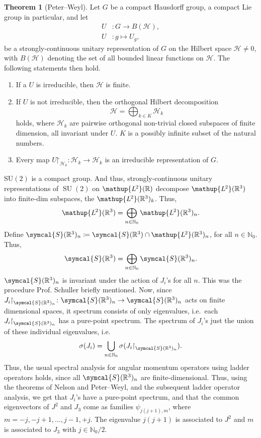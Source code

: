 \documentclass[12pt, a4 paper]{article}
\theoremstyle{definition}
\newtheorem{thm}{Theorem}
\newcommand{\ltwo}{\mathup{L\kern-0.7pt^2}}
\newcommand{\ltworthree}{\ltwo(\rr^3)}
\newcommand{\rr}{\mathbb{R}}
\newcommand{\nn}{\mathbb{N}_0}
\newcommand{\hilbert}{\mathcal{H}}
\newcommand{\ltwor}{\ltwo(\rr)}
\newcommand{\schwartz}{\symcal{S}}
\newcommand{\schwartzrthree}{\schwartz(\rr^3)}
\newcommand{\restr}{\mathord{\restriction}}
\begin{document}
	\begin{thm}[Peter--Weyl]
	    Let \(G\) be a compact Hausdorff group, a compact Lie group in particular, and let
		\begin{align*}
			U &\colon G \rightarrow B(\hilbert),\\
			U &\colon g \mapsto U_g,
		\end{align*}
		be a strongly-continuous unitary representation of $G$ on the Hilbert space $\hilbert \neq 0$, with $B(\hilbert)$ denoting the set of all bounded linear functions on $\hilbert$. The following statements then hold.
		\begin{enumerate}
		    \item If a \(U\) is irreducible, then \(\hilbert\) is finite.
			\item If \(U\) is not irreducible, then the orthogonal Hilbert decomposition
			\[
				\hilbert = \bigoplus_{k\in K} \hilbert_k
			\]
			holds, where \(\hilbert_k\) are pairwise orthogonal non-trivial closed subspaces of finite dimension, all invariant under \(U\). \(K\) is a possibly infinite subset of the natural numbers.
			\item Every map \(U\restr_{\hilbert_k} \colon \hilbert_k \rightarrow \hilbert_k\) is an irreducible representation of \(G\).
		\end{enumerate}
	\end{thm}

	\(\operatorname{SU(2)}\) is a compact group. And thus, strongly-continuous unitary representations of \(\operatorname{SU}(2)\) on \(\ltwor\) decompose \(\ltworthree\) into finite-dim subspaces, the \(\ltworthree_k\). Thus,
	\[
		\ltworthree = \bigoplus_{n \in \nn} \ltworthree_n.
	\]
	Define \(\schwartzrthree_n \coloneq \schwartzrthree \cap \ltworthree_n\), for all \(n \in \nn\). Thus,
	\[
	\schwartzrthree = \bigoplus_{n \in \nn} \schwartzrthree_n.
	\]
	\(\schwartzrthree_n\) is invariant under the action of \(J_i\)'s for all \(n\). This was the procedure Prof. Schuller briefly mentioned. Now, since \(J_i\restr_{\schwartzrthree_n} \colon \schwartzrthree_n \rightarrow \schwartzrthree_n\) acts on finite dimensional spaces, it spectrum consists of only eigenvalues, i.e.\ each \(J_i\restr_{\schwartzrthree_n}\) has a pure-point spectrum. The spectrum of \(J_i\)'s just the union of these individual eigenvalues, i.e.\
	\[
		\sigma(J_i) = \bigcup_{n \in \nn} \sigma(J_i\restr_{\schwartzrthree_n}).
	\]
	Thus, the usual spectral analysis for angular momentum operators using ladder operators holds, since all \(\schwartzrthree_n\) are finite-dimensional. Thus, using the theorems of Nelson and Peter--Weyl, and the subsequent ladder operator analysis, we get that $J_i$'s have a pure-point spectrum, and that the common eigenvectors of $J^2$ and $J_3$ come as families $\psi_{j(j+1), m}$, where $m = -j, -j+1, \ldots, j-1, +j$. The eigenvalue $j(j+1)$ is associated to $J^2$ and $m$ is associated to $J_3$ with $j \in \mathbb{N}_0/2$.
\end{document}
